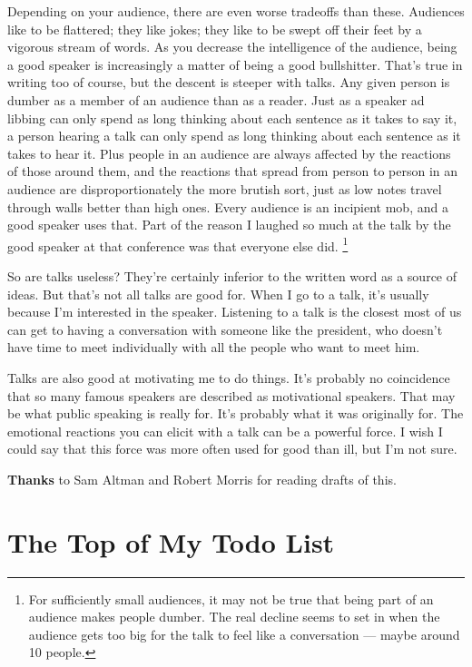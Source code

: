 \documentclass[12pt]{book}
\begin{document}
Depending on your audience, there are even worse tradeoffs than these.
Audiences like to be flattered; they like jokes; they like to be swept
off their feet by a vigorous stream of words. As you decrease the
intelligence of the audience, being a good speaker is increasingly a
matter of being a good bullshitter. That's true in writing too of
course, but the descent is steeper with talks. Any given person is
dumber as a member of an audience than as a reader. Just as a speaker ad
libbing can only spend as long thinking about each sentence as it takes
to say it, a person hearing a talk can only spend as long thinking about
each sentence as it takes to hear it. Plus people in an audience are
always affected by the reactions of those around them, and the reactions
that spread from person to person in an audience are disproportionately
the more brutish sort, just as low notes travel through walls better
than high ones. Every audience is an incipient mob, and a good speaker
uses that. Part of the reason I laughed so much at the talk by the good
speaker at that conference was that everyone else did.
\footnote{For sufficiently small audiences, it may not be true that being
part of an audience makes people dumber. The real decline seems to set
in when the audience gets too big for the talk to feel like a
conversation --- maybe around 10 people.}

So are talks useless? They're certainly inferior to the written word as
a source of ideas. But that's not all talks are good for. When I go to a
talk, it's usually because I'm interested in the speaker. Listening to a
talk is the closest most of us can get to having a conversation with
someone like the president, who doesn't have time to meet individually
with all the people who want to meet him.

Talks are also good at motivating me to do things. It's probably no
coincidence that so many famous speakers are described as motivational
speakers. That may be what public speaking is really for. It's probably
what it was originally for. The emotional reactions you can elicit with
a talk can be a powerful force. I wish I could say that this force was
more often used for good than ill, but I'm not sure.


\textbf{Thanks} to Sam Altman and Robert Morris for reading drafts of
this.
\chapter{The Top of My Todo List}
\end{document}
